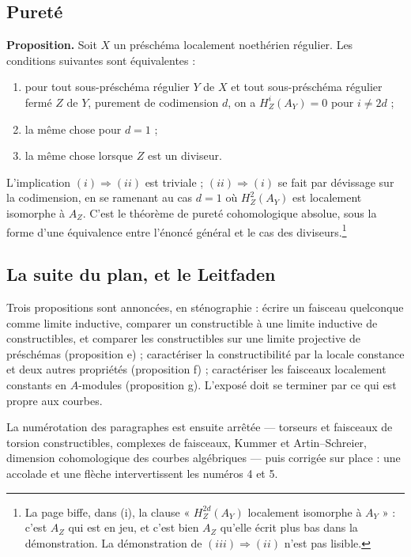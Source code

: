 \documentclass[11pt,a4paper]{article}
\begin{document}
\subsection*{Pureté}

\textbf{Proposition.} Soit $X$ un préschéma localement noethérien régulier.
Les conditions suivantes sont équivalentes :

\begin{enumerate}
\item[(i)] pour tout sous-préschéma régulier $Y$ de $X$ et tout sous-préschéma
régulier fermé $Z$ de $Y$, purement de codimension $d$, on a
$H^{i}_{Z}(A_{Y}) = 0$ pour $i \neq 2d$ ;
\item[(ii)] la même chose pour $d = 1$ ;
\item[(iii)] la même chose lorsque $Z$ est un diviseur.
\end{enumerate}

L'implication $(i) \Rightarrow (ii)$ est triviale ; $(ii) \Rightarrow (i)$ se
fait par dévissage sur la codimension, en se ramenant au cas $d = 1$ où
$H^{2}_{Z}(A_{Y})$ est localement isomorphe à $A_{Z}$. C'est le théorème de
pureté cohomologique absolue, sous la forme d'une équivalence entre l'énoncé
général et le cas des diviseurs.\footnote{La page biffe, dans (i), la clause
« $H^{2d}_{Z}(A_{Y})$ localement isomorphe à $A_{Y}$ » : c'est
$A_{Z}$ qui est en jeu, et c'est bien $A_{Z}$ qu'elle écrit plus bas dans la
démonstration. La démonstration de $(iii) \Rightarrow (ii)$ n'est pas
lisible.}

\subsection*{La suite du plan, et le Leitfaden}

Trois propositions sont annoncées, en sténographie : écrire un faisceau
quelconque comme limite inductive, comparer un constructible à une limite
inductive de constructibles, et comparer les constructibles sur une limite
projective de préschémas (proposition e) ; caractériser la constructibilité par
la locale constance et deux autres propriétés (proposition f) ; caractériser
les faisceaux localement constants en $A$-modules (proposition g). L'exposé
doit se terminer par ce qui est propre aux courbes.

La numérotation des paragraphes est ensuite arrêtée — torseurs et faisceaux de
torsion constructibles, complexes de faisceaux, Kummer et Artin--Schreier,
dimension cohomologique des courbes algébriques — puis corrigée sur place :
une accolade et une flèche intervertissent les numéros 4 et 5.
\end{document}

